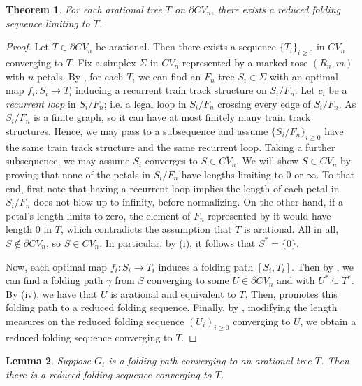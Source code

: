\documentclass[11pt, letterpaper]{amsart}
\theoremstyle{plain}
\newtheorem{theorem}{Theorem}[section]
\newtheorem{lemma}[theorem]{Lemma}
\theoremstyle{definition}
\newcommand{\ov}[1]{\overline{#1}}
\begin{document}
\begin{theorem}
  \label{thm:arational_limiting}
  For each arational tree $T$ on $\partial CV_n$, there exists a reduced folding
  sequence limiting to $T$. \end{theorem}
\begin{proof}
  Let $T \in \partial CV_n$ be arational.
  Then there exists a sequence $\{T_i\}_{i \ge 0}$ in $CV_n$ converging to $T$. Fix a
  simplex $\Sigma$ in $CV_n$ represented by a marked rose $(R_n,m)$ with $n$
  petals. By , for each $T_i$ we can find an $F_n$-tree $S_i \in
  \Sigma$ with an optimal map $f_i:S_i \to T_i$ inducing a recurrent train track
  structure on $S_i/F_n$. Let $c_i$ be a \emph{recurrent loop} in $S_i/F_n$; i.e. a legal loop in $S_i/F_n$ crossing every
  edge of $S_i/F_n$. As $S_i/F_n$ is a finite graph, so it can have at most finitely many train track
  structures. Hence, we may pass to a subsequence and assume $\{S_i/F_n\}_{i \ge 0}$
  have the same train track structure and the same recurrent
  loop. Taking a further subsequence, we may assume $S_i$
  converges to $S \in \ov{CV_n}$. We will show $S \in CV_n$ by proving that none of
  the petals in $S_i/F_n$ have lengths limiting to 0 or $\infty$. To that end, first note that 
  having a recurrent loop implies the length
  of each petal in $S_i/F_n$ does not blow up to infinity, before normalizing. On the other hand, if a petal's length limits to zero, the
  element of $F_n$ represented by it would have length 0 in $T$,
  which contradicts the assumption that $T$ is arational. All in all, $S
  \not\in\partial CV_n$, so $S \in CV_n$. In particular, by
  (i), it follows that $S^*=\{0\}$.

  Now, each optimal map $f_i:S_i \to T_i$ induces a folding path
  $[S_i,T_i]$. Then by , we can find a folding
  path $\gamma$ from $S$ converging to some $U\in\partial CV_n$ and
  with $U^*\subseteq T^*$. By (iv), we have that
  $U$ is arational and equivalent to $T$. Then,  promotes this
  folding path to a reduced folding sequence.
  Finally, by ,
  modifying the length measures on the reduced folding sequence $(U_i)_{i \ge 0}$ converging to $U$, we obtain a reduced folding sequence converging to $T$.
\end{proof}

\begin{lemma}\label{lem:arational_path_to_seq}
  Suppose $G_t$ is a folding path converging to an arational tree
  $T$. Then there is a reduced folding sequence converging to $T$.
\end{lemma}
\end{document}
